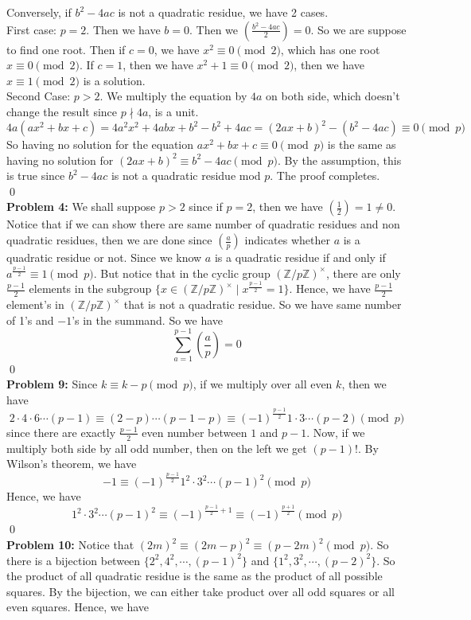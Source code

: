 \documentclass[12pt]{amsart}
\newcommand{\Z}{\mathbb{Z}}
\begin{document}
Conversely, if $b^2-4ac$ is not a quadratic residue, we have 2 cases.\\
First case: $p=2$. Then we have $b=0$. Then we $(\frac{b^2-4ac}{2})=0$. So we are suppose to find one root. Then if $c=0$, we have $x^2\equiv 0\pmod 2$, which has one root $x\equiv 0\pmod 2$. If $c=1$, then we have $x^2+1\equiv 0\pmod 2$, then we have $x\equiv 1\pmod 2$ is a solution.\\
Second Case: $p>2$. We multiply the equation by $4a$ on both side, which doesn't change the result since $p\nmid 4a$, is a unit. 
\[4a(ax^2+bx+c)=4a^2x^2+4abx+b^2-b^2+4ac=(2ax+b)^2-(b^2-4ac)\equiv 0\pmod p\]
So having no solution for the equation $ax^2+bx+c\equiv 0\pmod p$ is the same as having no solution for $(2ax+b)^2\equiv b^2-4ac\pmod p$. By the assumption, this is true since $b^2-4ac$ is not a quadratic residue mod $p$. The proof completes.
\\\qed\\
\textbf{Problem 4:} We shall suppose $p>2$ since if $p=2$, then we have $(\frac{1}{2})=1\neq 0$. Notice that if we can show there are same number of quadratic residues and non quadratic residues, then we are done since $(\frac{a}{p})$ indicates whether $a$ is a quadratic residue or not. Since we know $a$ is a quadratic residue if and only if $a^{\frac{p-1}{2}}\equiv 1 \pmod p$. But notice that in the cyclic group $(\Z/p\Z)^\times$, there are only $\frac{p-1}{2}$ elements in the subgroup $\{x\in(\Z/p\Z)^\times \mid x^\frac{p-1}{2}=1\}$. Hence, we have $\frac{p-1}{2}$ element's in $(\Z/p\Z)^\times$ that is not a quadratic residue. So we have same number of 1's and $-1$'s in the summand. So we have 
\[\sum_{a=1}^{p-1}(\frac{a}{p})=0\]
\qed\\
\textbf{Problem 9:} Since $k\equiv k-p\pmod p$, if we multiply over all even 
$k$, then we have 
\[2\cdot 4\cdot 6\cdots (p-1)\equiv (2-p)\cdots(p-1-p)\equiv (-1)^{\frac{p-1}{2}}1\cdot 3\cdots(p-2)\pmod p\]
since there are exactly $\frac{p-1}{2}$ even number between $1$ and $p-1$. Now, if we multiply both side by all odd number, then on the left we get $(p-1)!$. By Wilson's theorem, we have 
\[-1\equiv (-1)^\frac{p-1}{2}1^2\cdot 3^2\cdots (p-1)^2\pmod p\]
Hence, we have 
\[1^2\cdot 3^2\cdots (p-1)^2\equiv (-1)^{\frac{p-1}{2}+1}\equiv (-1)^{\frac{p+1}{2}}\pmod p\]
\qed\\
\textbf{Problem 10:} Notice that $(2m)^2\equiv (2m-p)^2\equiv (p-2m)^2\pmod p$. So there is a bijection between $\{2^2,4^2,\cdots,(p-1)^2\}$ and $\{1^2,3^2,\cdots, (p-2)^2\}$. So the product of all quadratic residue is the same as the product of all possible squares. By the bijection, we can either take product over all odd squares or all even squares. Hence, we have 
\end{document}
